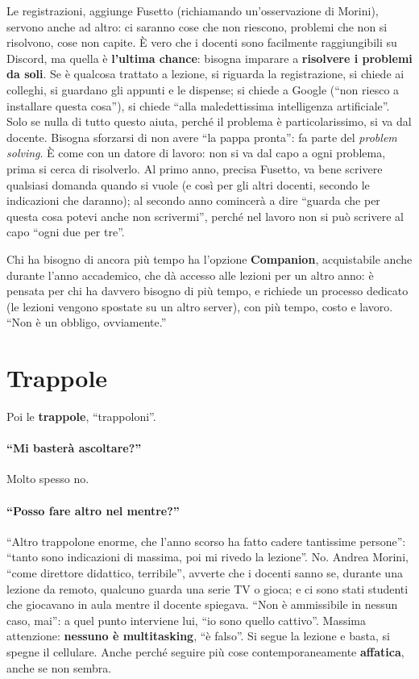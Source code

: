 Le registrazioni, aggiunge Fusetto (richiamando un'osservazione di Morini), servono anche ad altro: ci
saranno cose che non riescono, problemi che non si risolvono, cose non
capite. È vero che i docenti sono facilmente raggiungibili su Discord, ma
quella è \textbf{l'ultima chance}: bisogna imparare a \textbf{risolvere i
problemi da soli}. Se è qualcosa trattato a lezione, si riguarda la
registrazione, si chiede ai colleghi, si guardano gli appunti e le
dispense; si chiede a Google (``non riesco a installare questa cosa''), si
chiede ``alla maledettissima intelligenza artificiale''. Solo se nulla di
tutto questo aiuta, perché il problema è particolarissimo, si va dal
docente. Bisogna sforzarsi di non avere ``la pappa pronta'': fa parte del
\emph{problem solving}. È come con un datore di lavoro: non si va dal capo a
ogni problema, prima si cerca di risolverlo. Al primo anno, precisa
Fusetto, va bene scrivere qualsiasi domanda quando si vuole (e così per gli
altri docenti, secondo le indicazioni che daranno); al secondo anno
comincerà a dire ``guarda che per questa cosa potevi anche non scrivermi'',
perché nel lavoro non si può scrivere al capo ``ogni due per tre''.

Chi ha bisogno di ancora più tempo ha l'opzione \textbf{Companion},
acquistabile anche durante l'anno accademico, che dà accesso alle lezioni
per un altro anno: è pensata per chi ha davvero bisogno di più tempo, e
richiede un processo dedicato (le lezioni vengono spostate su un altro
server), con più tempo, costo e lavoro. ``Non è un obbligo, ovviamente.''

\section{Trappole}
\label{p1:sec:trappole}

Poi le \textbf{trappole}, ``trappoloni''.

\paragraph{``Mi basterà ascoltare?''} Molto spesso no.

\paragraph{``Posso fare altro nel mentre?''} ``Altro trappolone enorme, che
l'anno scorso ha fatto cadere tantissime persone'': ``tanto sono indicazioni
di massima, poi mi rivedo la lezione''. No. Andrea Morini, ``come direttore
didattico, terribile'', avverte che i docenti sanno se, durante una lezione
da remoto, qualcuno guarda una serie TV o gioca; e ci sono stati studenti
che giocavano in aula mentre il docente spiegava. ``Non è ammissibile in
nessun caso, mai'': a quel punto interviene lui, ``io sono quello cattivo''.
Massima attenzione: \textbf{nessuno è multitasking}, ``è falso''. Si segue la
lezione e basta, si spegne il cellulare. Anche perché seguire più cose
contemporaneamente \textbf{affatica}, anche se non sembra.

